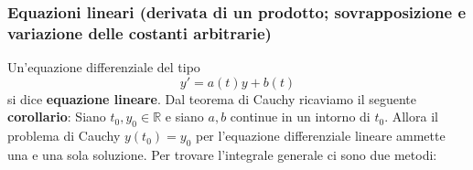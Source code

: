\subsubsection{Equazioni lineari (derivata di un prodotto; sovrapposizione e variazione delle costanti arbitrarie)}
Un'equazione differenziale del tipo
\[
    y' = a(t) y + b(t)
\]
si dice \textbf{equazione lineare}.\newline
\newline
Dal teorema di Cauchy ricaviamo il seguente \textbf{corollario}:\newline
Siano $t_0,y_0 \in \mathbb{R}$ e siano $a,b$ continue in un intorno di $t_0$. Allora il problema di Cauchy $y(t_0) = y_0$ per l'equazione differenziale lineare ammette una e una sola soluzione.\newline
\newline
Per trovare l'integrale generale ci sono due metodi:
